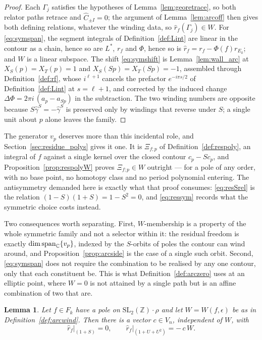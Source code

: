 \documentclass[11pt]{article}
\newtheorem{lemma}[theorem]{Lemma}
\newcommand{\ZZ}{\mathbb{Z}}
\newcommand{\CC}{\mathbb{C}}
\newcommand{\SLZ}{\mathrm{SL}_2(\ZZ)}
\begin{document}
\begin{proof}
Each $\Gamma_j$ satisfies the hypotheses of Lemma~\ref{lem:georetrace}, so both relator paths
retrace and $\hat C_{\pm I}=0$; the argument of Lemma~\ref{lem:arcoff} then gives both defining
relations, whatever the winding data, so $\hat r_f(\Gamma_j)\in W$. For \eqref{eq:symspan}, the
segment integrals of Definition~\ref{def:Lint} are linear in the contour as a chain, hence so are
$L^*$, $r_f$ and $\Phi$, hence so is $\hat r_f=r_f-\Phi(f)r_{E_k}$; and $W$ is a linear subspace.
The shift \eqref{eq:symshift} is Lemma~\ref{lem:wall_arc} at $X_S(p)=X_T(p)=1$ and
$X_S(Sp)=X_T(Sp)=-1$, assembled through Definition~\ref{def:rf}, whose $i^{\ell+1}$ cancels the
prefactor $e^{-i\pi s/2}$ of Definition~\ref{def:Lint} at $s=\ell+1$, and corrected by the induced
change $\Delta\Phi=2\pi i\,(a_p-a_{Sp})$ in the subtraction. The two winding numbers are opposite
because $S\hat\gamma^S=-\hat\gamma^S$ is preserved only by windings that reverse under $S$; a
single unit about $p$ alone leaves the family.
\end{proof}

The generator $v_p$ deserves more than this incidental role, and Section~\ref{sec:residue_polys}
gives it one. It is $\Xi_{f;p}$ of Definition~\ref{def:respoly}, an integral of $f$ against a single
kernel over the closed contour $c_p-Sc_p$, and Proposition~\ref{prop:respolyW} proves
$\Xi_{f;p}\in W$ outright --- for a pole of any order, with no base point, no homotopy class and no
period polynomial entering. The antisymmetry demanded here is exactly what that proof consumes:
\eqref{eq:resSrel} is the relation $(1-S)(1+S)=1-S^2=0$, and \eqref{eq:ressym} records what the
symmetric choice costs instead.

Two consequences worth separating. First, $W$-membership is a property of the whole symmetric
family and not a selector within it: the residual freedom is exactly
$\dim{\rm span}_\CC\{v_p\}$, indexed by the $S$-orbits of poles the contour can wind around, and
Proposition~\ref{prop:arcside} is the case of a single such orbit. Second, \eqref{eq:symspan}
does not require the combination to be realised by any one contour, only that each constituent be.
This is what Definition~\ref{def:arczero} uses at an elliptic point, where $W=0$ is not attained by
a single path but is an affine combination of two that are.


\begin{lemma}\label{lem:arcwind}
Let $f\in F_k$ have a pole on $\SLZ\!\cdot\!\rho$ and let $W=W(f,\epsilon)$ be as in
Definition~\ref{def:arcwind}. Then there is a vector $c\in V_n$, independent of $W$, with
\begin{equation}\label{eq:arcwind}
\hat r_f\big|_{(1+S)}=0,\qquad \hat r_f\big|_{(1+U+U^2)}=-\,c\,W .
\end{equation}
\end{lemma}
\end{document}
